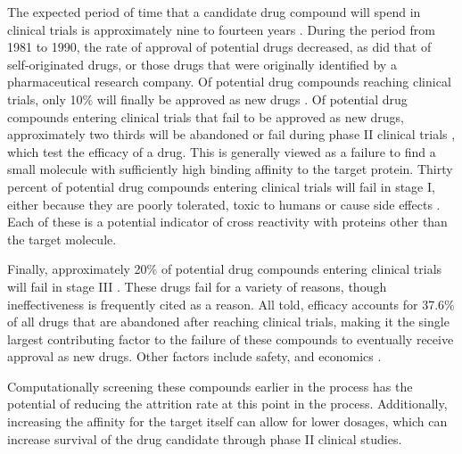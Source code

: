 The expected period of time that a candidate drug compound will spend in clinical trials is approximately nine to fourteen years \cite{dimasi2003price,paul2010improve}.
During the period from 1981 to 1990, the rate of approval of potential drugs decreased, as did that of self-originated drugs, or those drugs that were originally identified by a pharmaceutical research company.
Of potential drug compounds reaching clinical trials, only 10\% will finally be approved as new drugs \cite{dimasi2001risks,paul2010improve}.
Of potential drug compounds entering clinical trials that fail to be approved as new drugs, approximately two thirds will be abandoned or fail during phase II clinical trials \cite{unknown}, which test the efficacy of a drug.
This is generally viewed as a failure to find a small molecule with sufficiently high binding affinity to the target protein.
Thirty percent of potential drug compounds entering clinical trials will fail in stage I, either because they are poorly tolerated, toxic to humans or cause side effects \cite{unknown}.
Each of these is a potential indicator of cross reactivity with proteins other than the target molecule.

Finally, approximately 20\% of potential drug compounds entering clinical trials will fail in stage III \cite{unknown}.
These drugs fail for a variety of reasons, though ineffectiveness is frequently cited as a reason.
All told, efficacy accounts for 37.6\% of all drugs that are abandoned after reaching clinical trials, making it the single largest contributing factor to the failure of these compounds to eventually receive approval as new drugs.
Other factors include safety, and economics \cite{dimasi2001risks}.

Computationally screening these compounds earlier in the process has the potential of reducing the attrition rate at this point in the process.
Additionally, increasing the affinity for the target itself can allow for lower dosages, which can increase survival of the drug candidate through phase II clinical studies.

